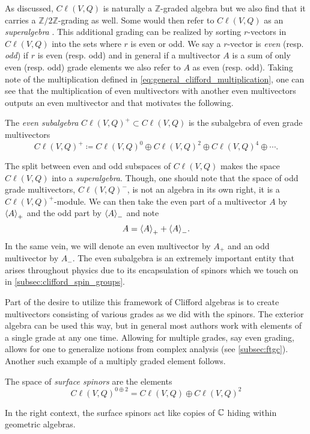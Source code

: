 As discussed, $C\ell(V,Q)$ is naturally a $\mathbb{Z}$-graded algebra but we also find that it carries a $\mathbb{Z}/2\mathbb{Z}$-grading as well. Some would then refer to $C\ell(V,Q)$ as an \emph{superalgebra} . This additional grading can be realized by sorting $r$-vectors in $C\ell(V,Q)$ into the sets where $r$ is even or odd.  We say a $r$-vector is \emph{even} (resp. \emph{odd}) if $r$ is even (resp. odd) and in general if a multivector $A$ is a sum of only even (resp. odd) grade elements we also refer to $A$ as even (resp. odd).  Taking note of the multiplication defined in \ref{eq:general_clifford_multiplication}, one can see that the multiplication of even multivectors with another even multivectors outputs an even multivector and that motivates the following.
\begin{definition}
The \emph{even subalgebra} $C\ell(V,Q)^+ \subset C\ell(V,Q)$ is the subalgebra of even grade multivectors
\begin{equation}
    C\ell(V,Q)^+ \coloneqq C\ell(V,Q)^0 \oplus C\ell(V,Q)^2 \oplus C\ell(V,Q)^4 \oplus \cdots.
\end{equation}
\end{definition}
The split between even and odd subspaces of $C\ell(V,Q)$ makes the space $C\ell(V,Q)$ into a \emph{superalgebra}. Though, one should note that the space of odd grade multivectors, $C\ell(V,Q)^-$, is not an algebra in its own right, it is a $C\ell(V,Q)^+$-module. We can then take the even part of a multivector $A$ by $\proj{+}{A}$ and the odd part by $\proj{-}{A}$ and note
\begin{equation}
A = \proj{+}{A} + \proj{-}{A}.
\end{equation}
In the same vein, we will denote an even multivector by $A_+$ and an odd multivector by $A_-$. The even subalgebra is an extremely important entity that arises throughout physics due to its encapsulation of spinors which we touch on in \cref{subsec:clifford_spin_groups}. 

Part of the desire to utilize this framework of Clifford algebras is to create multivectors consisting of various grades as we did with the spinors. The exterior algebra can be used this way, but in general most authors work with elements of a single grade at any one time. Allowing for multiple grades, say even grading, allows for one to generalize notions from complex analysis (see \cref{subsec:ftgc}). Another such example of a multiply graded element follows.
\begin{definition}
The space of \emph{surface spinors} are the elements
\begin{equation}
 C\ell(V,Q)^{0\oplus 2} = C\ell(V,Q)\oplus C\ell(V,Q)^2
\end{equation}
\end{definition}
In the right context, the surface spinors act like copies of $\C$ hiding within geometric algebras. 

